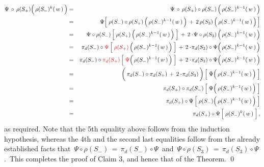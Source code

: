 \begin{eqnarray*}
\Psi \,\circ\, \rho(S_{+})\!\left(\,\rho(S_{-})^{k}(\,\overset{{\color{white}1}}{w}\,)\,\right)
& = &
	\Psi \,\circ\, \rho(S_{+}) \circ \rho(S_{-}) \left(\,\rho(S_{-})^{k-1}(\,\overset{{\color{white}1}}{w}\,)\,\right)
\\
& = &
	\Psi\!\left[\;
		\rho(S_{-}) \circ \rho(S_{+}) \left(\,\rho(S_{-})^{k-1}(\,\overset{{\color{white}1}}{w}\,)\,\right)
		\, + \,
		2\,\rho(S_{3}) \left(\,\rho(S_{-})^{k-1}(\,\overset{{\color{white}1}}{w}\,)\,\right)
		\,\right]
\\
& = &
	\Psi \circ \rho(S_{-}) \left[\;
		\rho(S_{+}) \left(\,\rho(S_{-})^{k-1}(\,\overset{{\color{white}1}}{w}\,)\,\right)
		\;\right]
	\, + \,
	2 \cdot\! \Psi \circ \rho(S_{3})
		\left(\,\rho(S_{-})^{k-1}(\,\overset{{\color{white}1}}{w}\,)\,\right)
\\
& = &
	\pi_{d}(S_{-}) \circ {\color{red}\Psi} \left[\;
		{\color{red}\rho(S_{+})} \left(\,\rho(S_{-})^{k-1}(\,\overset{{\color{white}1}}{w}\,)\,\right)
		\;\right]
	\, + \,
	2 \cdot\! \pi_{d}(S_{3}) \circ \Psi\!
		\left(\,\rho(S_{-})^{k-1}(\,\overset{{\color{white}1}}{w}\,)\,\right)
\\
& = &
	\pi_{d}(S_{-}) \circ {\color{red}\pi_{d}(S_{+})} \left[\;
		{\color{red}\Psi}\!\left(\,\rho(S_{-})^{k-1}(\,\overset{{\color{white}1}}{w}\,)\,\right)
		\;\right]
	\, + \,
	2 \cdot\! \pi_{d}(S_{3}) \circ \Psi\!
		\left(\,\rho(S_{-})^{k-1}(\,\overset{{\color{white}1}}{w}\,)\,\right)
\\
& = &
	\left(\,
		\pi_{d}(S_{-}) \circ \pi_{d}(S_{+})
		\, \overset{{\color{white}1}}{+} \,
		2 \cdot\! \pi_{d}(S_{3})
		\,\right)
	\left[\;
		\Psi\!\left(\,\rho(S_{-})^{k-1}(\,\overset{{\color{white}1}}{w}\,)\,\right)
		\;\right]
\\
& = &
	\pi_{d}(S_{+}) \circ \pi_{d}(S_{-})
	\left[\;
		\Psi\!\left(\,\rho(S_{-})^{k-1}(\,\overset{{\color{white}1}}{w}\,)\,\right)
		\;\right]
\\
& = &
	\pi_{d}(S_{+}) \circ \Psi
	\left[\;
		\rho(S_{-})\!\left(\,\rho(S_{-})^{k-1}(\,\overset{{\color{white}1}}{w}\,)\,\right)
		\;\right]
\\
& = &
	\pi_{d}(S_{+}) \circ \Psi
	\left[\;
		\rho(S_{-})^{k}(\,\overset{{\color{white}1}}{w}\,)
		\;\right],
\end{eqnarray*}
as required.
Note that the 5th equality above follows from the induction hypothesis,
whereas the 4th and the second last equalities follow from the already established facts that
\,$\Psi \circ \rho(S_{-}) \,=\, \pi_{d}(S_{-}) \circ \Psi$\,
and
\,$\Psi \circ \rho(S_{3}) \,=\, \pi_{d}(S_{3}) \circ \Psi$.\, 
This completes the proof of Claim 3, and hence that of the Theorem.
\qed

